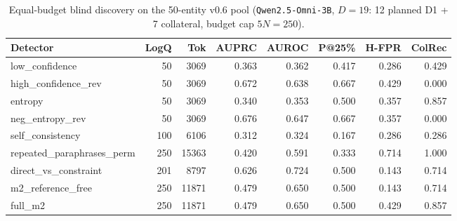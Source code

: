 \begin{table}[t]
\centering\small
\caption{Equal-budget blind discovery on the 50-entity v0.6 pool (\texttt{Qwen2.5-Omni-3B}, $D=19$: 12 planned D1 + 7 collateral, budget cap $5N=250$).}
\begin{tabular}{lrrrrrrr}
\toprule
Detector & LogQ & Tok & AUPRC & AUROC & P@25\% & H-FPR & ColRec \\
\midrule
low\_confidence & 50 & 3069 & 0.363 & 0.362 & 0.417 & 0.286 & 0.429 \\
high\_confidence\_rev & 50 & 3069 & 0.672 & 0.638 & 0.667 & 0.429 & 0.000 \\
entropy & 50 & 3069 & 0.340 & 0.353 & 0.500 & 0.357 & 0.857 \\
neg\_entropy\_rev & 50 & 3069 & 0.676 & 0.647 & 0.667 & 0.357 & 0.000 \\
self\_consistency & 100 & 6106 & 0.312 & 0.324 & 0.167 & 0.286 & 0.286 \\
repeated\_paraphrases\_perm & 250 & 15363 & 0.420 & 0.591 & 0.333 & 0.714 & 1.000 \\
direct\_vs\_constraint & 201 & 8797 & 0.626 & 0.724 & 0.500 & 0.143 & 0.714 \\
m2\_reference\_free & 250 & 11871 & 0.479 & 0.650 & 0.500 & 0.143 & 0.714 \\
full\_m2 & 250 & 11871 & 0.479 & 0.650 & 0.500 & 0.429 & 0.857 \\
\bottomrule
\end{tabular}
\end{table}
